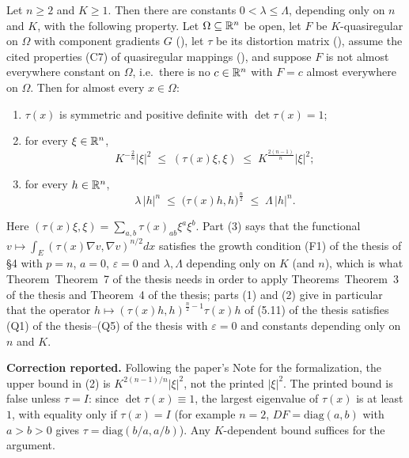 \begin{helper}
Let $n\ge2$ and $K\ge1$.  Then there are constants $0<\lambda\le\Lambda$,
depending only on $n$ and $K$, with the following property.  Let
$\Omega\subseteq\mathbb{R}^n$ be open, let $F$ be $K$-quasiregular on $\Omega$ with
component gradients $G$ (), let $\tau$ be its
distortion matrix (), assume the cited properties
(C7) of quasiregular mappings (), and suppose
$F$ is not almost everywhere constant on $\Omega$, i.e.\ there is no
$c\in\mathbb{R}^n$ with $F=c$ almost everywhere on $\Omega$.  Then for almost every
$x\in\Omega$:
\begin{enumerate}
\item $\tau(x)$ is symmetric and positive definite with $\det\tau(x)=1$;
\item for every $\xi\in\mathbb{R}^n$,
\[
K^{-\frac2n}|\xi|^2\;\le\;(\tau(x)\xi,\xi)\;\le\;K^{\frac{2(n-1)}n}|\xi|^2 ;
\]
\item for every $h\in\mathbb{R}^n$,
\[
\lambda\,|h|^{n}\;\le\;\bigl(\tau(x)h,h\bigr)^{\frac n2}\;\le\;\Lambda\,|h|^{n} .
\]
\end{enumerate}
Here $(\tau(x)\xi,\xi)=\sum_{a,b}\tau(x)_{ab}\xi^a\xi^b$.
Part (3) says that the functional
$v\mapsto\int_E(\tau(x)\nabla v,\nabla v)^{n/2}dx$ satisfies the growth condition
(F1) of the thesis of \S4 with $p=n$, $a=0$, $\varepsilon=0$ and $\lambda,\Lambda$
depending only on $K$ (and $n$), which is what Theorem~Theorem~7 of the thesis needs in
order to apply Theorems~Theorem~3 of the thesis and Theorem~4 of the thesis; parts (1) and (2) give in
particular that the operator
$h\mapsto(\tau(x)h,h)^{\frac n2-1}\tau(x)h$ of (5.11) of the thesis satisfies
(Q1) of the thesis--(Q5) of the thesis with $\varepsilon=0$ and constants depending only on
$n$ and $K$.

\medskip
\noindent\textbf{Correction reported.}  Following the paper's Note for the
formalization, the upper bound in (2) is $K^{2(n-1)/n}|\xi|^2$, not the printed
$|\xi|^2$.  The printed bound is false unless $\tau=I$: since
$\det\tau(x)\equiv1$, the largest eigenvalue of $\tau(x)$ is at least $1$, with
equality only if $\tau(x)=I$ (for example $n=2$, $DF=\mathrm{diag}(a,b)$ with
$a>b>0$ gives $\tau=\mathrm{diag}(b/a,a/b)$).  Any $K$-dependent bound suffices
for the argument.
\end{helper}
